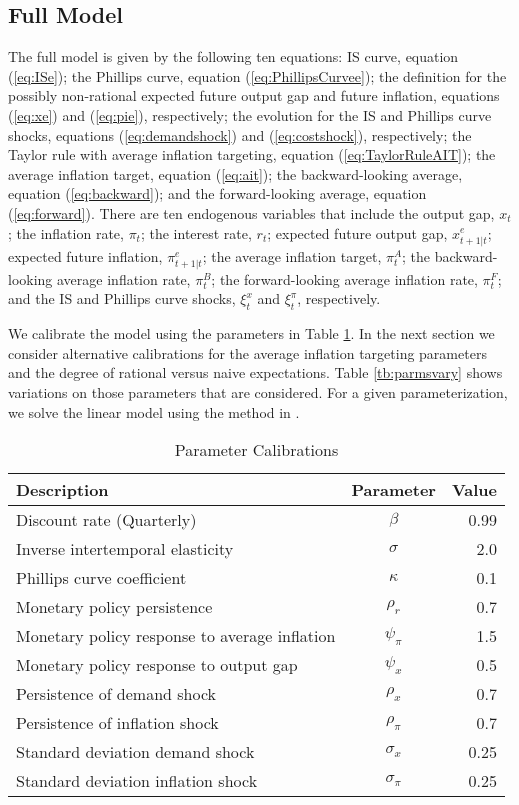 \documentclass[english,authoryear,12pt]{elsarticle}
\begin{document}
\subsection{Full Model}

The full model is given by the following ten equations: IS curve, equation (\ref{eq:ISe}); the Phillips curve, equation (\ref{eq:PhillipsCurvee}); the definition for the possibly non-rational expected future output gap and future inflation, equations (\ref{eq:xe}) and (\ref{eq:pie}), respectively; the evolution for the IS and Phillips curve shocks, equations (\ref{eq:demandshock}) and (\ref{eq:costshock}), respectively; the Taylor rule with average inflation targeting, equation (\ref{eq:TaylorRuleAIT}); the average inflation target, equation (\ref{eq:ait}); the backward-looking average, equation (\ref{eq:backward}); and the forward-looking average, equation (\ref{eq:forward}). There are ten endogenous variables that include the output gap, $x_t$; the inflation rate, $\pi_t$; the interest rate, $r_t$; expected future output gap, $x_{t+1|t}^e$; expected future inflation, $\pi_{t+1|t}^e$; the average inflation target, $\pi_t^A$; the backward-looking average inflation rate, $\pi_t^B$; the forward-looking average inflation rate, $\pi_t^F$; and the IS and Phillips curve shocks, $\xi_t^x$ and $\xi_t^\pi$, respectively.

We calibrate the model using the parameters in Table \ref{tb:parms}. In the next section we consider alternative calibrations for the average inflation targeting parameters and the degree of rational versus naive expectations. Table \ref{tb:parmsvary} shows variations on those parameters that are considered. For a given parameterization, we solve the linear model using the method in \cite{sims_solving_2002}.

\begin{table}\caption{Parameter Calibrations}\label{tb:parms}
	\begin{center}
		\begin{tabular}{lcr} \hline
			Description & Parameter & Value \\ \hline
			Discount rate (Quarterly) & $\beta$ & 0.99 \\
			Inverse intertemporal elasticity & $\sigma$ & 2.0 \\
			Phillips curve coefficient & $\kappa$ & 0.1 \\
			Monetary policy persistence & $\rho_r$ & 0.7 \\
			Monetary policy response to average inflation & $\psi_\pi$ & 1.5 \\
			Monetary policy response to output gap & $\psi_x$ & 0.5 \\
			Persistence of demand shock & $\rho_x$ & 0.7 \\
			Persistence of inflation shock & $\rho_\pi$ & 0.7 \\
			Standard deviation demand shock & $\sigma_x$ & 0.25 \\
			Standard deviation inflation shock & $\sigma_\pi$ & 0.25 \\
			\hline
		\end{tabular}
	\end{center}
\end{table}
\end{document}
